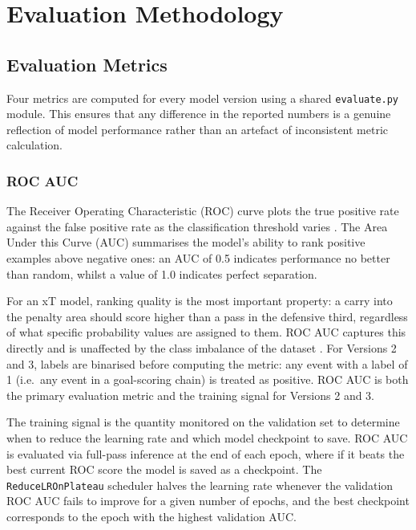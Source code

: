 \chapter{Evaluation Methodology}\label{ch:eval}

\section{Evaluation Metrics}

Four metrics are computed for every model version using a shared \texttt{evaluate.py} module. This ensures that any difference in the reported numbers is a genuine reflection of model performance rather than an artefact of inconsistent metric calculation.

\subsection{ROC AUC}

The Receiver Operating Characteristic (ROC) curve plots the true positive rate against the false positive rate as the classification threshold varies \cite{fawcett2006}. The Area Under this Curve (AUC) summarises the model's ability to rank positive examples above negative ones: an AUC of 0.5 indicates performance no better than random, whilst a value of 1.0 indicates perfect separation.

For an xT model, ranking quality is the most important property: a carry into the penalty area should score higher than a pass in the defensive third, regardless of what specific probability values are assigned to them. ROC AUC captures this directly and is unaffected by the class imbalance of the dataset \cite{fawcett2006}. For Versions 2 and 3, labels are binarised before computing the metric: any event with a label of 1 (i.e.\ any event in a goal-scoring chain) is treated as positive. ROC AUC is both the primary evaluation metric and the training signal for Versions 2 and 3.

The training signal is the quantity monitored on the validation set to determine when to reduce the learning rate and which model checkpoint to save. ROC AUC is evaluated via full-pass inference at the end of each epoch, where if it beats the best current ROC score the model is saved as a checkpoint. The \texttt{ReduceLROnPlateau} scheduler halves the learning rate whenever the validation ROC AUC fails to improve for a given number of epochs, and the best checkpoint corresponds to the epoch with the highest validation AUC.

